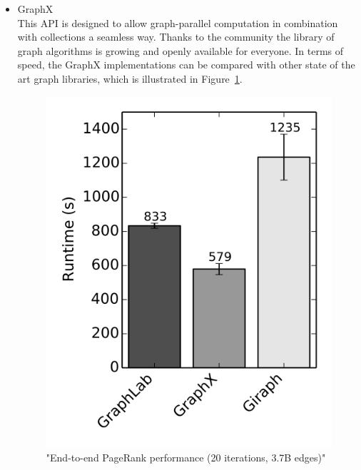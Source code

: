 \begin{itemize}
\item GraphX\\
    This API is designed to allow graph-parallel computation in combination with collections a seamless way.
    Thanks to the community the library of graph algorithms is growing and openly available for everyone.
    In terms of speed, the GraphX implementations can be compared with other state of the art graph libraries, which is illustrated in Figure~\ref{fig:spark_graphx}.

\begin{figure}[!htbp]
  \centering
  \includegraphics[keepaspectratio=true,scale=0.5]{img/spark_graphx}
    \caption{"End-to-end PageRank performance (20 iterations, 3.7B edges)" \cite{apache_spark}}
  \label{fig:spark_graphx}
\end{figure}

\end{itemize}

